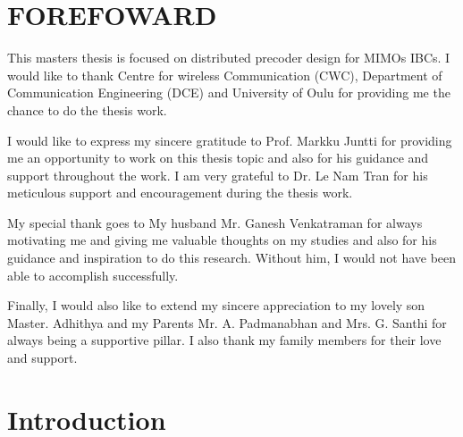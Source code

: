 \documentclass[a4paper, 12pt,titlepage]{dithesis} %
\begin{document}
\newpage


 

\newpage

\section*{\huge FOREFOWARD}

This masters thesis is focused on distributed precoder design for \acsp{MIMO} \acsp{IBC}. I would like to thank Centre for wireless Communication (CWC), Department of Communication Engineering (DCE) and University of Oulu for providing me the chance to do the thesis work.

I would like to express my sincere gratitude to Prof. Markku Juntti for providing me an opportunity to work on this thesis topic and also for his guidance and support throughout the work.  I am very grateful to Dr. Le Nam Tran for his meticulous support and encouragement during the thesis work. 

My special thank goes to My husband Mr. Ganesh Venkatraman for always motivating me and giving me valuable thoughts on my studies and also for  his guidance and inspiration to do this research. Without him, I would not have been able to  accomplish successfully.
 
Finally, I would also like to extend my sincere appreciation to my lovely son Master. Adhithya and my Parents Mr. A. Padmanabhan and Mrs. G. Santhi for always being a supportive pillar.  I also thank my family members for their love and support.

\newpage



 
\newpage


\section{\huge Introduction}
\end{document}
